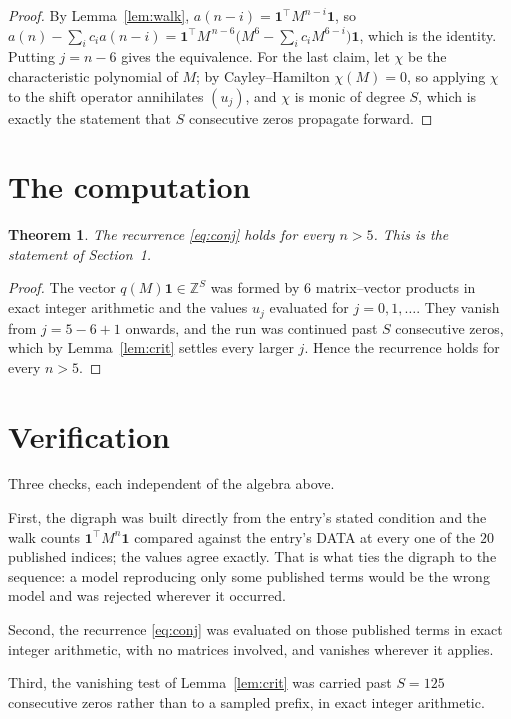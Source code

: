 \documentclass[11pt,a4paper]{article}
\theoremstyle{plain}
\newtheorem{theorem}{Theorem}
\theoremstyle{definition}
\begin{document}
\begin{proof}
By Lemma~\ref{lem:walk}, $a(n-i)=\mathbf{1}^{\!\top}M^{n-i}\mathbf{1}$, so
$a(n)-\sum_i c_i a(n-i)
=\mathbf{1}^{\!\top}M^{\,n-6}\bigl(M^{6}-\sum_i c_i M^{6-i}\bigr)
\mathbf{1}$, which is the identity. Putting $j=n-6$ gives the equivalence. For the
last claim, let $\chi$ be the characteristic polynomial of $M$; by Cayley--Hamilton
$\chi(M)=0$, so applying $\chi$ to the shift operator annihilates $(u_j)$, and $\chi$ is
monic of degree $S$, which is exactly the statement that $S$ consecutive zeros propagate
forward.
\end{proof}

\section{The computation}

\begin{theorem}
The recurrence \eqref{eq:conj} holds for every $n>5$. This is the statement of
Section~1.
\end{theorem}

\begin{proof}
The vector $q(M)\mathbf{1}\in\mathbb{Z}^{S}$ was formed by $6$ matrix--vector
products in exact integer arithmetic and the values $u_j$ evaluated for
$j=0,1,\dots$. They vanish from $j=5-6+1$ onwards, and the run was continued past
$S$ consecutive zeros, which by Lemma~\ref{lem:crit} settles every larger $j$. Hence the
recurrence holds for every $n>5$.
\end{proof}

\section{Verification}

Three checks, each independent of the algebra above.

First, the digraph was built directly from the entry's stated condition and the walk counts
$\mathbf{1}^{\!\top}M^{n}\mathbf{1}$ compared against the entry's DATA at every one of
the $20$ published indices; the values agree exactly. That is what ties the digraph to
the sequence: a model reproducing only some published terms would be the wrong model and
was rejected wherever it occurred.

Second, the recurrence \eqref{eq:conj} was evaluated on those published terms in exact
integer arithmetic, with no matrices involved, and vanishes wherever it applies.

Third, the vanishing test of Lemma~\ref{lem:crit} was carried past $S=125$ consecutive
zeros rather than to a sampled prefix, in exact integer arithmetic.
\end{document}
